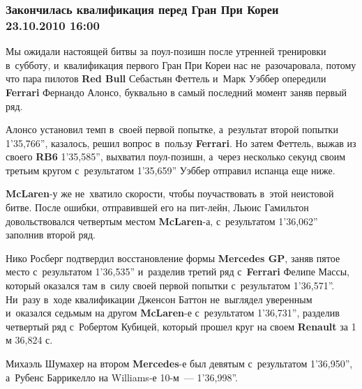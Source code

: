 \documentclass[12pt]{article}
\renewcommand{\emph}[1]{\textbf{#1}}
\begin{document}
\subsubsection*{Закончилась квалификация перед Гран При Кореи\\
\footnotesize{23.10.2010 16:00}}

Мы ожидали настоящей битвы за поул-позишн после утренней тренировки в~субботу, и~квалификация первого Гран При Кореи нас не~разочаровала, потому что пара пилотов \emph{Red Bull} Себастьян Феттель и~Марк Уэббер опередили \emph{Ferrari} Фернандо Алонсо, буквально в самый последний момент заняв первый ряд.

Алонсо установил темп в~своей первой попытке, а~результат второй попытки 1'35,766'', казалось, решил вопрос в~пользу \emph{Ferrari}. Но затем Феттель, выжав из своего \emph{RB6} 1'35,585'', выхватил поул-позишн, а~через несколько секунд своим третьим кругом с~результатом 1'35,659'' Уэббер отправил испанца еще ниже.

\emph{McLaren}-у же не~хватило скорости, чтобы поучаствовать в~этой неистовой битве. После ошибки, отправившей его на пит-лейн, Льюис Гамильтон довольствовался четвертым местом \emph{McLaren}-а, с~результатом 1'36,062'' заполнив второй ряд.

Нико Росберг подтвердил восстановление формы \emph{Mercedes GP}, заняв пятое место с~результатом 1'36,535'' и~разделив третий ряд с~\emph{Ferrari} Фелипе Массы, который оказался там в~силу своей первой попытки с~результатом 1'36,571''. Ни~разу в~ходе квалификации Дженсон Баттон не~выглядел уверенным и~оказался седьмым на другом \emph{McLaren}-е с~результатом 1'36,731'', разделив четвертый ряд с~Робертом Кубицей, который прошел круг на своем \emph{Renault} за 1 м 36,824 с.

Михаэль Шумахер на втором \emph{Mercedes}-е был девятым с~результатом 1'36,950'', а~Рубенс Баррикелло на Williams-е 10-м~--- 1'36,998''.
\end{document}
